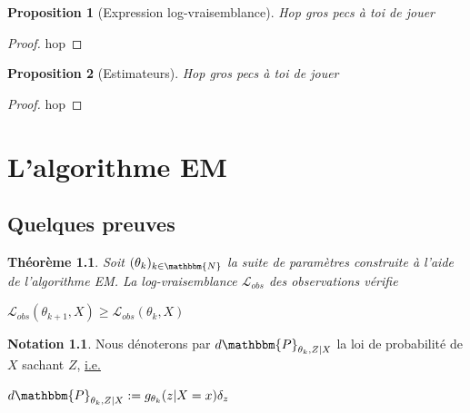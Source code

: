 \documentclass[frenchb]{report}
\newcommand{\N}{\mathbbm{N}}
\newcommand{\1}{\mathbbm{1}}
\newcommand{\prob}{\mathbbm{P}}
\newcommand{\lv}{\mathcal{L}}
\newtheorem{prop}{Proposition}
\newtheorem{thm}{Théorème}
\theoremstyle{definition}\newtheorem{defn}{Définition}
\theoremstyle{definition}\newtheorem{exm}{Exemple}
\theoremstyle{definition}\newtheorem{nota}{Notation}
\theoremstyle{definition}\newtheorem{rem}{Remarque}
\begin{document}
\begin{prop}[Expression log-vraisemblance]
Hop gros pecs à toi de jouer
\end{prop}

\begin{proof}
hop
\end{proof}

\begin{prop}[Estimateurs]
Hop gros pecs à toi de jouer
\end{prop}

\begin{proof}
hop
\end{proof}




\pagebreak

\chapter{L'algorithme EM}


\section{Quelques preuves}

\begin{thm}
Soit $(\theta_k)_{k\in \N}$ la suite de paramètres construite à l'aide de l'algorithme EM. La log-vraisemblance $\lv_{obs}$ des observations vérifie 
\begin{center} $\lv_{obs}(\theta_{k+1}, X) \geq \lv_{obs}(\theta_k, X)$ \end{center}
\end{thm}

\begin{nota} Nous dénoterons par $d\prob_{\theta_k, Z | X}$ la loi de probabilité de $X$ sachant $Z$, \underline{i.e.} \end{nota}
\begin{center} $d\prob_{\theta_k, Z | X} := g_{\theta_k}(z|X=x)\delta_z$ \end{center}
\end{document}
